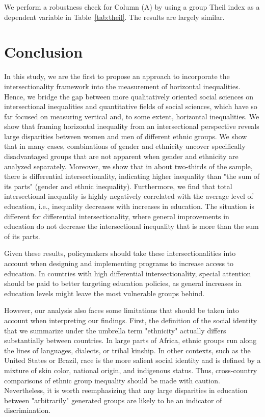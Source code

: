 We perform a robustness check for Column (A) by using a group Theil index as a dependent variable in Table~\ref{tab:theil}. The results are largely similar.
\hypertarget{conclusion}{%
\section{Conclusion}\label{conclusion}}

In this study, we are the first to propose an approach to incorporate the intersectionality framework into the measurement of horizontal inequalities. Hence, we bridge the gap between more qualitatively oriented social sciences on intersectional inequalities and quantitative fields of social sciences, which have so far focused on measuring vertical and, to some extent, horizontal inequalities. We show that framing horizontal inequality from an intersectional perspective reveals large disparities between women and men of different ethnic groups. We show that in many cases, combinations of gender and ethnicity uncover specifically disadvantaged groups that are not apparent when gender and ethnicity are analyzed separately. Moreover, we show that in about two-thirds of the sample, there is differential intersectionality, indicating higher inequality than "the sum of its parts" (gender and ethnic inequality). Furthermore, we find that total intersectional inequality is highly negatively correlated with the average level of education, i.e., inequality decreases with increases in education. The situation is different for differential intersectionality, where general improvements in education do not decrease the intersectional inequality that is more than the sum of its parts. 
 
Given these results, policymakers should take these intersectionalities into account when designing and implementing programs to increase access to education. In countries with high differential intersectionality, special attention should be paid to better targeting education policies, as general increases in education levels might leave the most vulnerable groups behind. 

However, our analysis also faces some limitations that should be taken into account when interpreting our findings. First, the definition of the social identity that we summarize under the umbrella term "ethnicity" actually differs substantially between countries. In large parts of Africa, ethnic groups run along the lines of languages, dialects, or tribal kinship. In other contexts, such as the United States or Brazil, race is the more salient social identity and is defined by a mixture of skin color, national origin, and indigenous status. Thus, cross-country comparisons of ethnic group inequality should be made with caution. Nevertheless, it is worth reemphasizing that any large disparities in education between "arbitrarily" generated groups are likely to be an indicator of discrimination. 

